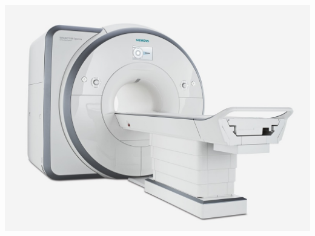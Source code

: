 \begin{frame}
    \begin{center}
        \includegraphics[height=0.9\textheight]{images/spectra}
    \end{center}
\end{frame}

